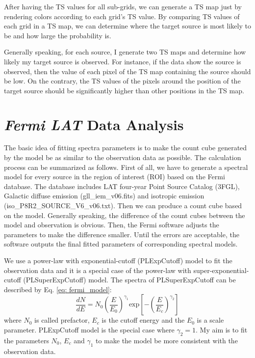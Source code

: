 \documentclass[12pt]{report}
\begin{document}
          After having the TS values for all sub-grids, we can generate a TS map just by 
          rendering colors according to each grid's TS value. By comparing TS values of 
          each grid in a TS map, we can determine where the target source is most likely to 
          be and how large the probability is. 
          
          Generally speaking, for each source, I generate two TS maps and determine how likely 
          my target source is observed. For instance, if the data show the source is observed, 
          then the value of each pixel of the TS map containing the source should be low. 
          On the contrary, the TS values of the pixels around the position of the target 
          source should be significantly higher than other positions in the TS map.
       
        \section{\textit{Fermi LAT} Data Analysis}
          The basic idea of fitting spectra parameters is to make the count cube generated by 
          the model be as similar to the observation data as possible. The calculation process 
          can be summarized as follows. First of all, we have to generate a spectral model 
          for every source in the region of interest (ROI) based on the Fermi database.
          The database includes LAT four-year Point Source Catalog (3FGL), Galactic 
          diffuse emission (gll\_iem\_v06.fits) and isotropic emission 
          (iso\_P8R2\_SOURCE\_V6\_v06.txt). Then we can produce a count cube based on the 
          model. Generally speaking, the difference of the count cubes between the model and 
          observation is obvious. Then, the Fermi software adjusts the parameters 
          to make the difference smaller. Until the errors are acceptable, the software 
          outputs the final fitted parameters of corresponding spectral models.  

          We use a power-law with exponential-cutoff (PLExpCutoff) model to fit the 
          observation data and it is a special case of the power-law with 
          super-exponential-cutoff (PLSuperExpCutoff) model. The spectra of PLSuperExpCutoff 
          can be described by Eq. \ref{eq: fermi_model}:  
          \begin{equation} 
            \label{eq: fermi_model}
            \frac{dN}{dE} = N_{0} \left(\frac{E}{E_0}\right)^{\gamma_1}\mbox{exp}\left[-\left(\frac{E}{E_c}\right)^{\gamma_2}\right]
          \end{equation}  
          where $N_0$ is called prefactor, $E_c$ is the cutoff energy and the $E_0$ is a scale 
          parameter. PLExpCutoff model is the special case where $\gamma_2=1$. My aim is to 
          fit the parameters $N_0$, $E_c$ and $\gamma_1$ to make the model be more 
          consistent with the observation data.
\end{document}
